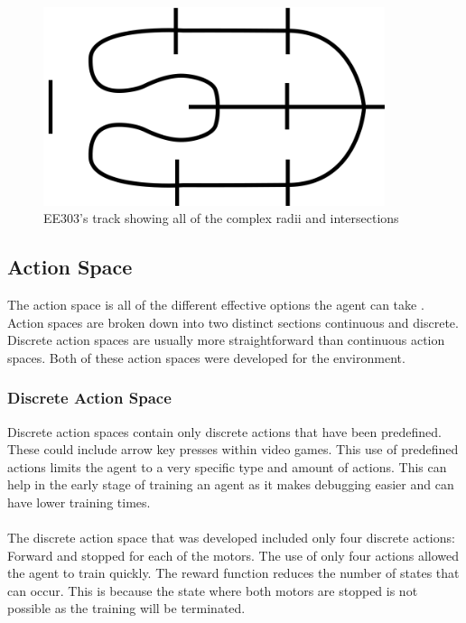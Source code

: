 \documentclass[a4paper,12pt]{article}
\begin{document}
 \begin{figure}[H]
 \centering
 \includegraphics[width=10cm]{imgs/Track.png}
 \caption{EE303's track showing all of the complex radii and intersections \cite{KevinMcGuinness}}
 \label{fig:Track}
 \end{figure}

\subsection{Action Space}
The action space is all of the different effective options the agent can take \cite{zhu2021overview}. Action spaces are broken down into two distinct sections continuous and discrete. Discrete action spaces are usually more straightforward than continuous action spaces. Both of these action spaces were developed for the environment. 

\subsubsection{Discrete Action Space}
Discrete action spaces contain only discrete actions that have been predefined. These could include arrow key presses within video games. This use of predefined actions limits the agent to a very specific type and amount of actions. This can help in the early stage of training an agent as it makes debugging easier and can have lower training times.
\\\\
The discrete action space that was developed included only four discrete actions: Forward and stopped for each of the motors. The use of only four actions allowed the agent to train quickly. The reward function reduces the number of states that can occur. This is because the state where both motors are stopped is not possible as the training will be terminated. 
\end{document}
